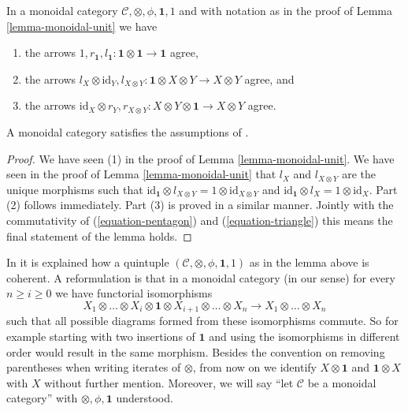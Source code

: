 \begin{lemma}
\label{lemma-monoidal-coherence}
In a monoidal category $\mathcal{C}, \otimes, \phi, \mathbf{1}, 1$
and with notation as in the proof of Lemma \ref{lemma-monoidal-unit}
we have
\begin{enumerate}
\item the arrows $1, r_\mathbf{1}, l_\mathbf{1} :
\mathbf{1} \otimes \mathbf{1} \to \mathbf{1}$ agree,
\item the arrows
$l_X \otimes \text{id}_Y, l_{X \otimes Y} :
\mathbf{1} \otimes X \otimes Y \to X \otimes Y$ agree, and
\item the arrows
$\text{id}_X \otimes r_Y , r_{X \otimes Y} :
X \otimes Y \otimes \mathbf{1} \to X \otimes Y$ agree.
\end{enumerate}
A monoidal category satisfies the assumptions of
\cite[Theorem 5.2]{associativity}.
\end{lemma}

\begin{proof}
We have seen (1) in the proof of Lemma \ref{lemma-monoidal-unit}.
We have seen in the proof of Lemma \ref{lemma-monoidal-unit}
that $l_X$ and $l_{X \otimes Y}$ are
the unique morphisms such that
$\text{id}_\mathbf{1} \otimes l_{X \otimes Y} =
1 \otimes \text{id}_{X \otimes Y}$ and
$\text{id}_\mathbf{1} \otimes l_X = 1 \otimes \text{id}_X$.
Part (2) follows immediately. Part (3) is proved in a similar manner.
Jointly with the commutativity of (\ref{equation-pentagon})
and (\ref{equation-triangle}) this means the final statement of
the lemma holds.
\end{proof}

\noindent
In \cite[Theorem 5.2]{associativity} it is explained how a quintuple
$(\mathcal{C}, \otimes, \phi, \mathbf{1}, 1)$ as in the lemma above
is coherent. A reformulation is that in a monoidal category (in our sense)
for every $n \geq i \geq 0$ we have functorial isomorphisms
$$
X_1 \otimes \ldots \otimes X_i \otimes \mathbf{1}
\otimes X_{i + 1} \otimes \ldots \otimes X_n
\to
X_1 \otimes \ldots \otimes X_n
$$
such that all possible diagrams formed from these isomorphisms
commute. So for example starting with two insertions of $\mathbf{1}$
and using the isomorphisms in different order would result in the same
morphism. Besides the convention on removing parentheses when writing
iterates of $\otimes$, from now on we identify $X \otimes \mathbf{1}$ and
$\mathbf{1} \otimes X$ with $X$ without further mention.
Moreover, we will say ``let $\mathcal{C}$ be a monoidal category''
with $\otimes, \phi, \mathbf{1}$ understood.

